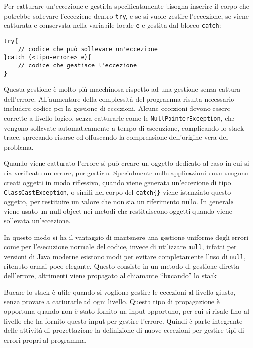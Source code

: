 \documentclass{article}
\numberwithin{equation}{subsection}
\begin{document}
Per catturare un'eccezione e gestirla specificatamente bisogna inserire il corpo che potrebbe sollevare l'eccezione dentro \verb|try|, e se si vuole gestire l'eccezione, 
se viene catturata e conservata nella variabile locale \verb|e| e gestita dal blocco \verb|catch|:
\begin{verbatim}
try{
    // codice che può sollevare un'eccezione
}catch (<tipo-errore> e){
    // codice che gestisce l'eccezione
}   
\end{verbatim}

Questa gestione è molto più macchinosa rispetto ad una gestione senza cattura dell'errore. All'aumentare della complessità del programma risulta necessario includere 
codice per la gestione di eccezioni. 
Alcune eccezioni devono essere corrette a livello logico, senza catturarle come le \verb|NullPointerException|, che vengono sollevate automaticamente a tempo di esecuzione, 
complicando lo stack trace, sprecando risorse ed offuscando la comprensione dell'origine vera del problema. 

Quando viene catturato l'errore si può creare un oggetto dedicato al caso in cui si sia verificato un errore, per gestirlo. Specialmente nelle applicazioni 
dove vengono creati oggetti in modo riflessivo, quando viene generata un'eccezione di tipo \verb|ClassCastException|, o simili nel corpo del \verb|catch{}| 
viene istanziato questo oggetto, per restituire un valore che non sia un riferimento nullo. In generale viene usato un null object nei metodi che 
restituiscono oggetti quando viene sollevata un'eccezione. 

In questo modo si ha il vantaggio di mantenere una gestione uniforme degli errori come per l'esecuzione normale del codice, invece di utilizzare \verb|null|, 
infatti per versioni di Java moderne esistono modi per evitare completamente l'uso di \verb|null|, ritenuto ormai poco elegante. 
Questo consiste in un metodo di gestione diretta dell'errore, altrimenti viene propagato al chiamante ``bucando'' lo stack 

Bucare lo stack è utile quando si vogliono gestire le eccezioni al livello giusto, senza provare a catturarle ad ogni livello. Questo tipo di propagazione è opportuna 
quando non è stato fornito un input opportuno, per cui si risale fino al livello che ha fornito questo input per gestire l'errore. 
Quindi è parte integrante delle attività di progettazione la definizione di nuove eccezioni per gestire tipi di errori propri al programma. 
\end{document}
